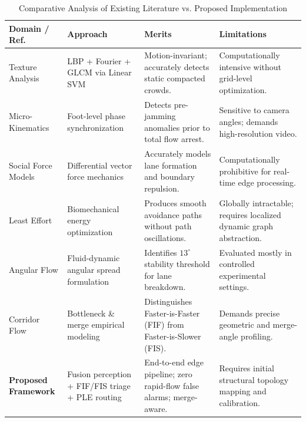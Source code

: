 \documentclass[12pt,a4paper]{article}
\begin{document}
\begin{table}[htbp]
\centering
\caption{Comparative Analysis of Existing Literature vs. Proposed Implementation}
\label{tab:lit_review}
\fontsize{9pt}{11pt}\selectfont
\begin{tabular}{@{}p{1.0in}p{1.2in}p{1.8in}p{1.7in}@{}}
\toprule
\textbf{Domain / Ref.} & \textbf{Approach} & \textbf{Merits} & \textbf{Limitations} \\ \midrule
Texture Analysis \cite{basalamah2020pedestrian, shao2018crowdhuman} & LBP + Fourier + GLCM via Linear SVM & Motion-invariant; accurately detects static compacted crowds. & Computationally intensive without grid-level optimization. \\
Micro-Kinematics \cite{scienceadv2025foot, mai2025evaluating} & Foot-level phase synchronization & Detects pre-jamming anomalies prior to total flow arrest. & Sensitive to camera angles; demands high-resolution video. \\
Social Force Models \cite{helbing1995social, helbing2000simulating, depta2014self} & Differential vector force mechanics & Accurately models lane formation and boundary repulsion. & Computationally prohibitive for real-time edge processing. \\
Least Effort \cite{guy2010pledestrians, zipf1949human} & Biomechanical energy optimization & Produces smooth avoidance paths without path oscillations. & Globally intractable; requires localized dynamic graph abstraction. \\
Angular Flow \cite{bacik2023lane, bacik2025logic} & Fluid-dynamic angular spread formulation & Identifies $13^\circ$ stability threshold for lane breakdown. & Evaluated mostly in controlled experimental settings. \\
Corridor Flow \cite{liao2017faster, corbetta2021physics} & Bottleneck \& merge empirical modeling & Distinguishes Faster-is-Faster (FIF) from Faster-is-Slower (FIS). & Demands precise geometric and merge-angle profiling. \\
\textbf{Proposed Framework} & Fusion perception + FIF/FIS triage + PLE routing & End-to-end edge pipeline; zero rapid-flow false alarms; merge-aware. & Requires initial structural topology mapping and calibration. \\ \bottomrule
\end{tabular}
\end{table}
\end{document}

